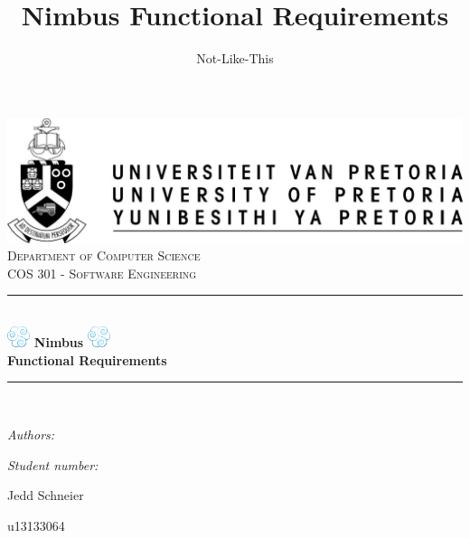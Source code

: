 \documentclass[a4paper,12pt]{report}
\author{Not-Like-This}
\title{ Nimbus Functional Requirements}
\newcommand{\HRule}{\rule{\linewidth}{0.5mm}}
\begin{document}
\setlength{\parskip}{6pt}

\begin{titlepage}

\begin{center}
\includegraphics[width=1\textwidth]{./up-logo.jpg}\\[0.4cm]    
\textsc{\LARGE Department of Computer Science}\\[1.5cm]
\textsc{\Large COS 301 - Software Engineering}\\[0.5cm]
\HRule \\[0.4cm]
\includegraphics[width=0.05\textwidth]{./logo.png} 
{ \huge \bfseries Nimbus}
\includegraphics[width=0.05\textwidth]{./logo.png}\\[0.4cm] 
{ \huge \bfseries Functional Requirements}\\[0.4cm]
\HRule \\[0.4cm]
\begin{minipage}{0.4\textwidth}
\begin{flushleft} \large
\emph{Authors:}
\end{flushleft}
\end{minipage}
\begin{minipage}{0.4\textwidth}
\begin{flushright} \large
\emph{Student number:}
\end{flushright}
\end{minipage}

\begin{minipage}{0.4\textwidth}
\begin{flushleft} \large
Jedd {Schneier}
\end{flushleft}
\end{minipage}
\begin{minipage}{0.4\textwidth}
\begin{flushright} \large
\emph{}
u13133064
\end{flushright}
\end{minipage}


\end{center}
\end{titlepage}
\end{document}
